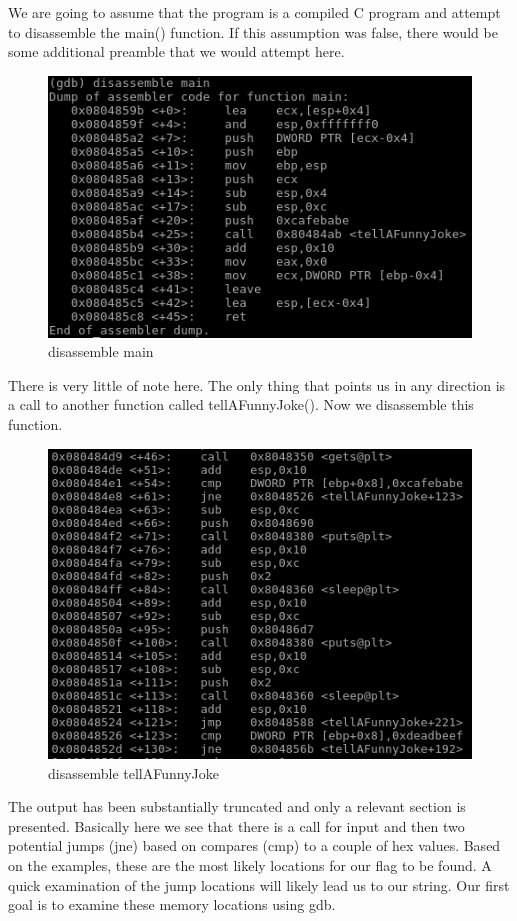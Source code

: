 \documentclass[10pt]{article}
\begin{document}
We are going to assume that the program is a compiled C program and attempt to disassemble the main() function.  If this assumption was false, there would be some additional preamble that we would attempt here.

\begin{figure}[H]
\centering
\includegraphics[scale=0.5]{./images/ss6.png}
\caption{disassemble main}
\label{fig:Code}
\end{figure}

There is very little of note here.  The only thing that points us in any direction is a call to another function called tellAFunnyJoke().  Now we disassemble this function.

\begin{figure}[H]
\centering
\includegraphics[scale=0.5]{./images/ss7.png}
\caption{disassemble tellAFunnyJoke}
\label{fig:Code}
\end{figure}

The output has been substantially truncated and only a relevant section is presented.  Basically here we see that there is a call for input and then two potential jumps (jne) based on compares (cmp) to a couple of hex values.  Based on the examples, these are the most likely locations for our flag to be found.  A quick examination of the jump locations will likely lead us to our string.  Our first goal is to examine these memory locations using gdb.
\end{document}

